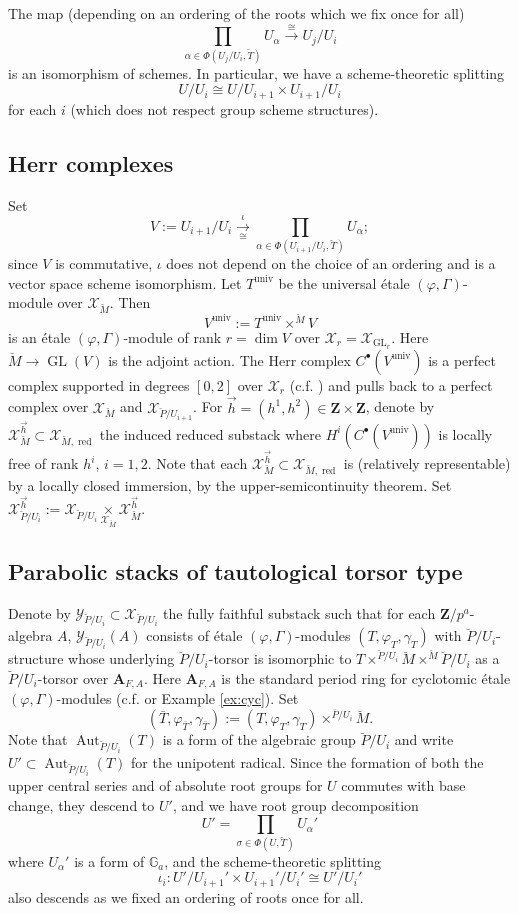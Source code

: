 \documentclass[11pt]{amsart}
\numberwithin{thm}{section}
\numberwithin{lem}{section}
\numberwithin{cor}{section}
\numberwithin{prop}{section}
\numberwithin{exam}{section}
\numberwithin{dfn}{section}
\newcommand{\red}{{\operatorname{red}}}
\newcommand{\Aut}{\operatorname{Aut}}
\newcommand{\univ}{{\operatorname{univ}}}
\newcommand{\GL}{\operatorname{GL}}
\newcommand{\cX}{\mathcal{X}}
\newcommand{\cY}{\mathcal{Y}}
\newcommand{\G}{\mathbb{G}}
\newcommand{\bM}{\breve{M}}
\newcommand{\bP}{\breve{P}}
\newcommand{\bT}{\breve{T}}
\newcommand{\A}{\mathbf{A}}
\newcommand{\Z}{\mathbf{Z}}
\begin{document}
The map
(depending on an ordering of the roots
which we fix once for all)
\begin{equation}
\label{eq:splitting}
\prod_{\alpha\in \Phi(U_j/U_i, \bT)}U_\alpha
\xrightarrow{\cong}
U_j/U_i
\end{equation}
is an isomorphism of schemes.
In particular,
we have a scheme-theoretic splitting
\[
U/U_{i} \cong U/U_{i+1} \times U_{i+1}/U_i
\]
for each $i$
(which does not respect group scheme structures).

\subsection{Herr complexes}
Set 
\[
V:=U_{i+1}/U_i\xrightarrow[\cong]{\iota} \prod_{\alpha\in \Phi(U_{i+1}/U_i, \bT)}U_\alpha;
\]
since $V$ is commutative,
$\iota$ does not depend on the choice
of an ordering and is a vector space scheme
isomorphism.
Let $T^{\univ}$ be the universal
\'etale $(\varphi, \Gamma)$-module
over $\cX_{\bM}$.
Then
\[
V^\univ:=T^\univ\times^{\bM}V
\]
is an \'etale $(\varphi, \Gamma)$-module
of rank $r=\dim V$
over $\cX_{r}=\cX_{\GL_r}$.
Here $\bM\to\GL(V)$
is the adjoint action.
The Herr complex
$C^\bullet(V^\univ)$
is a perfect complex supported in degrees $[0,2]$
over $\cX_r$
(c.f. \cite[Theorem 5.1.22]{EG23})
and pulls back to a perfect complex
over $\cX_{\bM}$
and $\cX_{\bP/U_{i+1}}$.
For $\vec h=(h^1,h^2)\in \Z\times \Z$,
denote by
$\cX_{\bM}^{\vec h}\subset \cX_{\bM,\red}$
the induced reduced substack where $H^i(C^\bullet(V^\univ))$
is locally free of rank $h^i$, $i=1,2$.
Note that each 
$\cX_{\bM}^{\vec h}\subset \cX_{\bM,\red}$
is (relatively representable)
by a locally closed immersion,
by the upper-semicontinuity theorem.
Set $\cX_{\bP/U_i}^{\vec h}:=
\cX_{\bP/U_i}\underset{\cX_{\bM}}{\times}\cX_{\bM}^{\vec h}$.

\subsection{Parabolic stacks of tautological torsor type}
Denote by $\cY_{\bP/U_i}\subset \cX_{\bP/U_i}$
the fully faithful substack
such that for each $\Z/p^a$-algebra $A$,
$\cY_{\bP/U_i}(A)$ consists of \'etale
$(\varphi, \Gamma)$-modules
$(T, \varphi_T, \gamma_T)$ with $\bP/U_i$-structure whose underlying
$\bP/U_i$-torsor is isomorphic
to
$T\times^{\bP/U_i}\bM \times^{\bM} \bP/U_i$
as a $\bP/U_i$-torsor over $\A_{F,A}$.
Here $\A_{F,A}$ is the standard period ring
for cyclotomic \'etale $(\varphi, \Gamma)$-modules
(c.f. \cite{EG23} or Example \ref{ex:cyc}).
Set \[
(\bar T, \varphi_{\bar T}, \gamma_{\bar T})
:=(T, \varphi_T, \gamma_T)\times^{\bar P/U_i}\bM.
\]
Note that $\Aut_{\bP/U_i}(T)$
is a form of the algebraic group
$\bP/U_i$
and write $U'\subset \Aut_{\bP/U_i}(T)$
for the unipotent radical.
Since the formation of both
the upper central series
and of absolute root groups for
$U$ commutes with base change,
they descend to $U'$,
and we have root group decomposition
\[
U'=\prod_{\sigma\in \Phi(U, \bT)}U_\alpha'
\]
where $U_\alpha'$
is a form of $\G_a$,
and the scheme-theoretic splitting
\[
\iota_i: U'/U_{i+1}'\times U_{i+1}'/U_i'
\cong U'/U_i'
\]
also descends
as we fixed an ordering of roots once for all.
\end{document}

